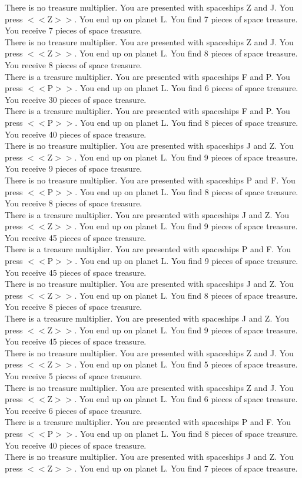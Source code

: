 \documentclass[pdflatex,sn-nature]{sn-jnl}%
\theoremstyle{thmstyleone}%
\theoremstyle{thmstyletwo}%
\theoremstyle{thmstylethree}%
\begin{document}
There is no treasure multiplier. You are presented with spaceships Z and J. You press $<<$Z$>>$. You end up on planet L. You find 7 pieces of space treasure. You receive 7 pieces of space treasure. $~$\\ 
There is no treasure multiplier. You are presented with spaceships Z and J. You press $<<$Z$>>$. You end up on planet L. You find 8 pieces of space treasure. You receive 8 pieces of space treasure. $~$\\ 
There is a treasure multiplier. You are presented with spaceships F and P. You press $<<$P$>>$. You end up on planet L. You find 6 pieces of space treasure. You receive 30 pieces of space treasure. $~$\\ 
There is a treasure multiplier. You are presented with spaceships F and P. You press $<<$P$>>$. You end up on planet L. You find 8 pieces of space treasure. You receive 40 pieces of space treasure. $~$\\ 
There is no treasure multiplier. You are presented with spaceships J and Z. You press $<<$Z$>>$. You end up on planet L. You find 9 pieces of space treasure. You receive 9 pieces of space treasure. $~$\\ 
There is no treasure multiplier. You are presented with spaceships P and F. You press $<<$P$>>$. You end up on planet L. You find 8 pieces of space treasure. You receive 8 pieces of space treasure. $~$\\ 
There is a treasure multiplier. You are presented with spaceships J and Z. You press $<<$Z$>>$. You end up on planet L. You find 9 pieces of space treasure. You receive 45 pieces of space treasure. $~$\\ 
There is a treasure multiplier. You are presented with spaceships P and F. You press $<<$P$>>$. You end up on planet L. You find 9 pieces of space treasure. You receive 45 pieces of space treasure. $~$\\ 
There is no treasure multiplier. You are presented with spaceships J and Z. You press $<<$Z$>>$. You end up on planet L. You find 8 pieces of space treasure. You receive 8 pieces of space treasure. $~$\\ 
There is a treasure multiplier. You are presented with spaceships J and Z. You press $<<$Z$>>$. You end up on planet L. You find 9 pieces of space treasure. You receive 45 pieces of space treasure. $~$\\ 
There is no treasure multiplier. You are presented with spaceships Z and J. You press $<<$Z$>>$. You end up on planet L. You find 5 pieces of space treasure. You receive 5 pieces of space treasure. $~$\\ 
There is no treasure multiplier. You are presented with spaceships Z and J. You press $<<$Z$>>$. You end up on planet L. You find 6 pieces of space treasure. You receive 6 pieces of space treasure. $~$\\ 
There is a treasure multiplier. You are presented with spaceships P and F. You press $<<$P$>>$. You end up on planet L. You find 8 pieces of space treasure. You receive 40 pieces of space treasure. $~$\\ 
There is no treasure multiplier. You are presented with spaceships J and Z. You press $<<$Z$>>$. You end up on planet L. You find 7 pieces of space treasure.  
\end{document}
